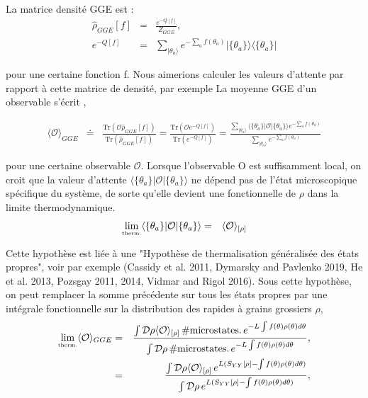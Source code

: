 	La matrice densité GGE est :
	\begin{eqnarray}
		\hat{\rho}_{GGE}[f] & = & \frac{e^{-Q[f]}}{Z_{GGE}}, \\
		e^{-Q[f]} & = & 	\sum_{\vert \theta_a \rangle} e^{- \sum_a f(\theta_a) } \vert \{ \theta_a\} \rangle \langle  \{ \theta_a\}  \vert 
	\end{eqnarray}
	
	pour une certaine fonction f. Nous aimerions calculer les valeurs d'attente par rapport à cette matrice de densité, par exemple
	La moyenne GGE d'un observable s'écrit ,
	
	\begin{eqnarray}
		\langle \mathcal{O} \rangle_{GGE} & \doteq & \frac{\text{Tr} (\mathcal{O}\hat{\rho}_{GGE}[f])}{\text{Tr} (\hat{\rho}_{GGE}[f])} = \frac{\text{Tr} (\mathcal{O}e^{-Q[f]})}{\text{Tr} (e^{-Q[f]})}	 = \frac{\sum_{\vert \theta_a \rangle} \langle  \{ \theta_a\}  \vert   \mathcal{O} \vert \{ \theta_a\} \rangle e^{- \sum_a f(\theta_a) }  }{\sum_{\vert \theta_a \rangle} e^{- \sum_a f(\theta_a) } }
	\end{eqnarray}
	
	pour une certaine observable $\mathcal{O}$. Lorsque l'observable O est suffisamment local, on croit que la valeur d'attente $\langle  \{ \theta_a\}  \vert   \mathcal{O} \vert \{ \theta_a\} \rangle$ ne dépend pas de l'état microscopique spécifique du système, de sorte qu'elle devient une fonctionnelle de $\rho$ dans la limite thermodynamique.
	\begin{eqnarray}
		\underset{\mbox{\tiny therm.}}{\lim} \langle  \{ \theta_a\}  \vert   \mathcal{O} \vert \{ \theta_a\} \rangle & = & \langle \mathcal{O}\rangle_{[\rho]}
	\end{eqnarray}
	
	Cette hypothèse est liée à une "Hypothèse de thermalisation généralisée des états propres", voir par exemple (Cassidy et al. 2011, Dymarsky and Pavlenko 2019, He et al. 2013, Pozsgay 2011, 2014, Vidmar and Rigol 2016). Sous cette hypothèse, on peut remplacer la somme précédente sur tous les états propres par une intégrale fonctionnelle sur la distribution des rapides à grains grossiers $\rho$,
	\begin{eqnarray}
		\underset{\mbox{\tiny therm.}}{\lim} \langle \mathcal{O}\rangle_{GGE} & = & \frac{\int \mathcal{D} \rho \langle \mathcal{O}\rangle_{[\rho]} \, \#\mbox{microstates.}\,  e^{-L\int f ( \theta ) \rho ( \theta ) d \theta } }{\int \mathcal{D} \rho  \, \#\mbox{microstates.}\,  e^{-L\int f ( \theta ) \rho ( \theta ) d \theta }},\\
		& = & \frac{\int \mathcal{D} \rho \langle \mathcal{O}\rangle_{[\rho]} \,   e^{L ( S_{YY}[\rho] -  \int f ( \theta ) \rho ( \theta ) d \theta) }}{\int \mathcal{D} \rho  \,  e^{L ( S_{YY}[\rho] -  \int f ( \theta ) \rho ( \theta ) d \theta)  }},
	\end{eqnarray}
	
